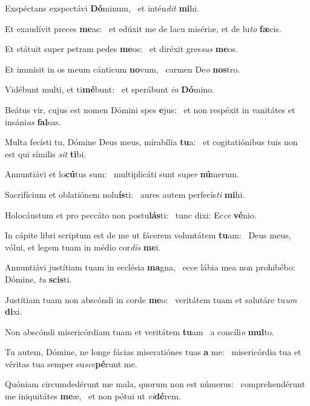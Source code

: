 \item Exspéctans exspectávi \textbf{Dó}minum,~\psstar{} et intén\textit{dit} \textbf{mi}hi.
\item Et exaudívit preces \textbf{me}as:~\psstar{} et edúxit me de lacu misériæ, et de lu\textit{to} \textbf{fæ}cis.
\item Et státuit super petram pedes \textbf{me}os:~\psstar{} et diréxit gres\textit{sus} \textbf{me}os.
\item Et immísit in os meum cánticum \textbf{no}vum,~\psstar{} carmen De\textit{o} \textbf{nos}tro.
\item Vidébunt multi, et ti\textbf{mé}bunt:~\psstar{} et sperábunt \textit{in} \textbf{Dó}mino.
\item Beátus vir, cujus est nomen Dómini spes \textbf{e}jus:~\psstar{} et non respéxit in vanitátes et insáni\textit{as} \textbf{fal}sas.
\item Multa fecísti tu, Dómine Deus meus, mirabília \textbf{tu}a:~\psstar{} et cogitatiónibus tuis non est qui símilis \textit{sit} \textbf{ti}bi.
\item Annuntiávi et lo\textbf{cú}tus sum:~\psstar{} multiplicáti sunt su\textit{per} \textbf{nú}merum.
\item Sacrifícium et oblatiónem nolu\textbf{ís}ti:~\psstar{} aures autem perfecís\textit{ti} \textbf{mi}hi.
\item Holocáustum et pro peccáto non postu\textbf{lás}ti:~\psstar{} tunc dixi: Ec\textit{ce} \textbf{vé}nio.
\item In cápite libri scriptum est de me ut fácerem voluntátem \textbf{tu}am:~\psstar{} Deus meus, vólui, et legem tuam in médio cor\textit{dis} \textbf{me}i.
\item Annuntiávi justítiam tuam in ecclésia \textbf{ma}gna,~\psstar{} ecce lábia mea non prohibébo: Dómine, \textit{tu} \textbf{scis}ti.
\item Justítiam tuam non abscóndi in corde \textbf{me}o:~\psstar{} veritátem tuam et salutáre tu\textit{um} \textbf{di}xi.
\item Non abscóndi misericórdiam tuam et veritátem \textbf{tu}am~\psstar{} a concíli\textit{o} \textbf{mul}to.
\item Tu autem, Dómine, ne longe fácias miseratiónes tuas \textbf{a} me:~\psstar{} misericórdia tua et véritas tua semper su\textit{sce}\textbf{pé}runt me.
\item Quóniam circumdedérunt me mala, quorum non est númerus:~\pscross{} comprehendérunt me iniquitátes \textbf{me}æ,~\psstar{} et non pótui ut \textit{vi}\textbf{dé}rem.
